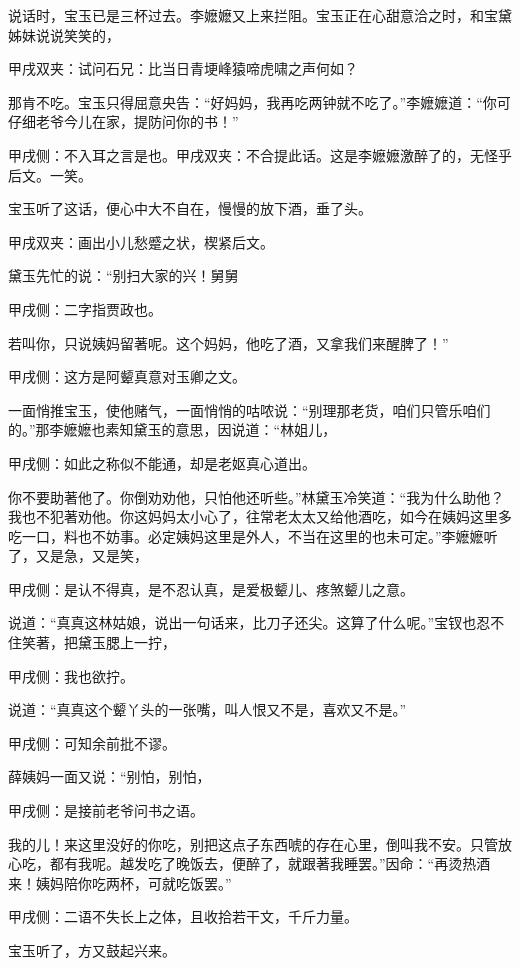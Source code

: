 \begin{parag}
    说话时，宝玉已是三杯过去。李嬷嬷又上来拦阻。宝玉正在心甜意洽之时，和宝黛姊妹说说笑笑的，\begin{note}甲戌双夹：试问石兄：比当日青埂峰猿啼虎啸之声何如？\end{note}那肯不吃。宝玉只得屈意央告：“好妈妈，我再吃两钟就不吃了。”李嬷嬷道：“你可仔细老爷今儿在家，提防问你的书！”\begin{note}甲戌侧：不入耳之言是也。甲戌双夹：不合提此话。这是李嬷嬷激醉了的，无怪乎后文。一笑。\end{note}宝玉听了这话，便心中大不自在，慢慢的放下酒，垂了头。\begin{note}甲戌双夹：画出小儿愁蹙之状，楔紧后文。\end{note}黛玉先忙的说：“别扫大家的兴！舅舅\begin{note}甲戌侧：二字指贾政也。\end{note}若叫你，只说姨妈留著呢。这个妈妈，他吃了酒，又拿我们来醒脾了！”\begin{note}甲戌侧：这方是阿颦真意对玉卿之文。\end{note}一面悄推宝玉，使他赌气，一面悄悄的咕哝说：“别理那老货，咱们只管乐咱们的。”那李嬷嬷也素知黛玉的意思，因说道：“林姐儿，\begin{note}甲戌侧：如此之称似不能通，却是老妪真心道出。\end{note}你不要助著他了。你倒劝劝他，只怕他还听些。”林黛玉冷笑道：“我为什么助他？我也不犯著劝他。你这妈妈太小心了，往常老太太又给他酒吃，如今在姨妈这里多吃一口，料也不妨事。必定姨妈这里是外人，不当在这里的也未可定。”李嬷嬷听了，又是急，又是笑，\begin{note}甲戌侧：是认不得真，是不忍认真，是爱极颦儿、疼煞颦儿之意。\end{note}说道：“真真这林姑娘，说出一句话来，比刀子还尖。这算了什么呢。”宝钗也忍不住笑著，把黛玉腮上一拧，\begin{note}甲戌侧：我也欲拧。\end{note}说道：“真真这个颦丫头的一张嘴，叫人恨又不是，喜欢又不是。”\begin{note}甲戌侧：可知余前批不谬。\end{note}薛姨妈一面又说：“别怕，别怕，\begin{note}甲戌侧：是接前老爷问书之语。\end{note}我的儿！来这里没好的你吃，别把这点子东西唬的存在心里，倒叫我不安。只管放心吃，都有我呢。越发吃了晚饭去，便醉了，就跟著我睡罢。”因命：“再烫热酒来！姨妈陪你吃两杯，可就吃饭罢。”\begin{note}甲戌侧：二语不失长上之体，且收拾若干文，千斤力量。\end{note}宝玉听了，方又鼓起兴来。
\end{parag}


